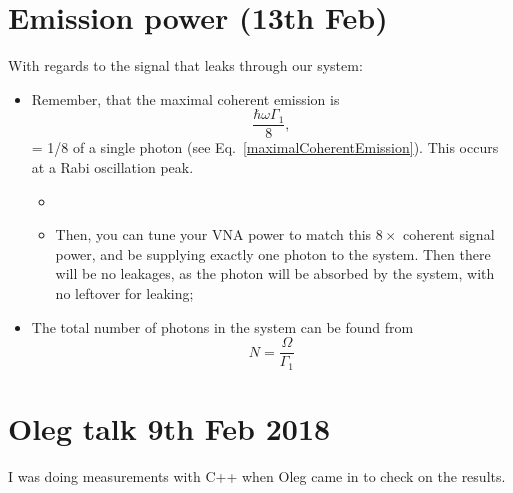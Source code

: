 \section{Emission power (13th Feb)}
 With regards to the signal that leaks through our system:
 \begin{itemize}
 	\item Remember, that the maximal coherent emission is \[ \frac{\hbar\omega\Gamma_1}{8}, \]\noindent = 1/8 of a single photon (see Eq.~\ref{maximalCoherentEmission}). This occurs at a Rabi oscillation peak. 
 	
 	\begin{itemize}
 		\item {}
 		\item Then, you can tune your VNA power to match this $ 8\times $ coherent signal power, and be supplying exactly one photon to the system. Then there will be no leakages, as the photon will be absorbed by the system, with no leftover for leaking;
 	\end{itemize}
 	\item The total number of photons in the system can be found from 
 	\begin{equation}\label{key}
 		N = \frac{\Omega}{\Gamma_1}
 	\end{equation}
 	 
 \end{itemize} 
 
 
\section{Oleg talk 9th Feb 2018}
 I was doing measurements with C++ when Oleg came in to check on the results.
 

